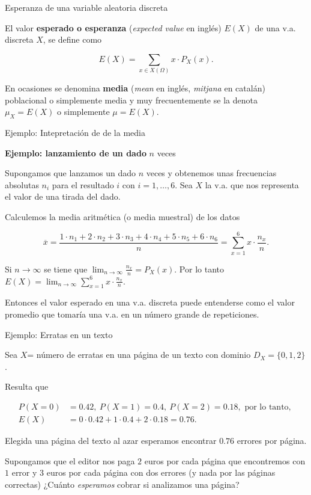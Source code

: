 \documentclass[
  letterpaper,
  DIV=11,
  numbers=noendperiod]{scrreprt}
\begin{document}
Esperanza de una variable aleatoria discreta

El valor \textbf{esperado o esperanza} (\emph{expected value} en inglés)
\(E(X)\) de una v.a. discreta \(X\), se define como

\[
E(X)=\sum_{x\in X(\Omega)} x\cdot P_{X}(x).
\]

En ocasiones se denomina \textbf{media} (\emph{mean} en inglés,
\emph{mitjana} en catalán) poblacional o simplemente media y muy
frecuentemente se la denota \(\mu_{X}=E(X)\) o simplemente \(\mu=E(X)\).

Ejemplo: Intepretación de de la media

\textbf{Ejemplo: lanzamiento de un dado} \(n\) veces

Supongamos que lanzamos un dado \(n\) veces y obtenemos unas frecuencias
absolutas \(n_{i}\) para el resultado \(i\) con \(i=1,\ldots,6\). Sea
\(X\) la v.a. que nos representa el valor de una tirada del dado.

Calculemos la media aritmética (o media muestral) de los datos

\[
\overline{x}=\frac{1\cdot n_1+2\cdot  n_2+3\cdot  n_3+4\cdot  n_4+5\cdot  n_5+6 \cdot 
n_6}{n}=\sum_{x=1}^6 x \cdot \frac{n_{x}}{n}.
\]

Si \(n\to \infty\) se tiene que
\(\displaystyle\lim_{n\to \infty} \frac{n_{x}}{n}=P_{X}(x).\) Por lo
tanto
\(E(X)=\displaystyle \lim_{n\to\infty}\sum_{x=1}^6x \cdot \frac{n_{x}}{n}.\)

Entonces el valor esperado en una v.a. discreta puede entenderse como el
valor promedio que tomaría una v.a. en un número grande de repeticiones.

Ejemplo: Erratas en un texto

Sea \(X\)= número de erratas en una página de un texto con dominio
\(D_X=\{0,1,2\}\).

Resulta que

\begin{align*}
P(X=0)&= 0.42,\ P(X=1)=0.4,\ P(X=2)=0.18, \mbox{ por lo tanto, }\\
E(X)&= 0\cdot 0.42+ 1\cdot 0.4 + 2 \cdot 0.18=0.76.
\end{align*}

Elegida una página del texto al azar esperamos encontrar \(0.76\)
errores por página.

Supongamos que el editor nos paga \(2\) euros por cada página que
encontremos con \(1\) error y \(3\) euros por cada página con dos
errores (y nada por las páginas correctas) ¿Cuánto \emph{esperamos}
cobrar si analizamos una página?
\end{document}
